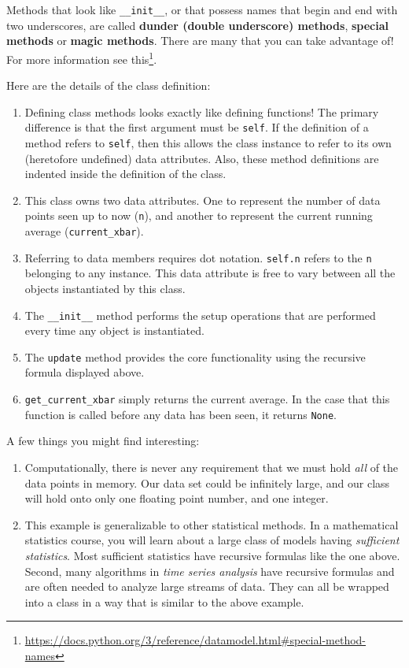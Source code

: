 \documentclass[
  12pt,
  krantz2]{krantz}
\renewcommand{\href}[2]{#2\footnote{\url{#1}}}
\begin{document}
Methods that look like \texttt{\_\_init\_\_}, or that possess names that begin and end with two underscores, are called \textbf{dunder (double underscore) methods}, \textbf{special methods} or \textbf{magic methods}. There are many that you can take advantage of! For more information see \href{https://docs.python.org/3/reference/datamodel.html\#special-method-names}{this}.

Here are the details of the class definition:

\begin{enumerate}
\def\labelenumi{\arabic{enumi}.}
\item
  Defining class methods looks exactly like defining functions! The primary difference is that the first argument must be \texttt{self}. If the definition of a method refers to \texttt{self}, then this allows the class instance to refer to its own (heretofore undefined) data attributes. Also, these method definitions are indented inside the definition of the class.
\item
  This class owns two data attributes. One to represent the number of data points seen up to now (\texttt{n}), and another to represent the current running average (\texttt{current\_xbar}).
\item
  Referring to data members requires dot notation. \texttt{self.n} refers to the \texttt{n} belonging to any instance. This data attribute is free to vary between all the objects instantiated by this class.
\item
  The \texttt{\_\_init\_\_} method performs the setup operations that are performed every time any object is instantiated.
\item
  The \texttt{update} method provides the core functionality using the recursive formula displayed above.
\item
  \texttt{get\_current\_xbar} simply returns the current average. In the case that this function is called before any data has been seen, it returns \texttt{None}.
\end{enumerate}

A few things you might find interesting:

\begin{enumerate}
\def\labelenumi{\roman{enumi}.}
\item
  Computationally, there is never any requirement that we must hold \emph{all} of the data points in memory. Our data set could be infinitely large, and our class will hold onto only one floating point number, and one integer.
\item
  This example is generalizable to other statistical methods. In a mathematical statistics course, you will learn about a large class of models having \emph{sufficient statistics}. Most sufficient statistics have recursive formulas like the one above. Second, many algorithms in \emph{time series analysis} have recursive formulas and are often needed to analyze large streams of data. They can all be wrapped into a class in a way that is similar to the above example.
\end{enumerate}
\end{document}

